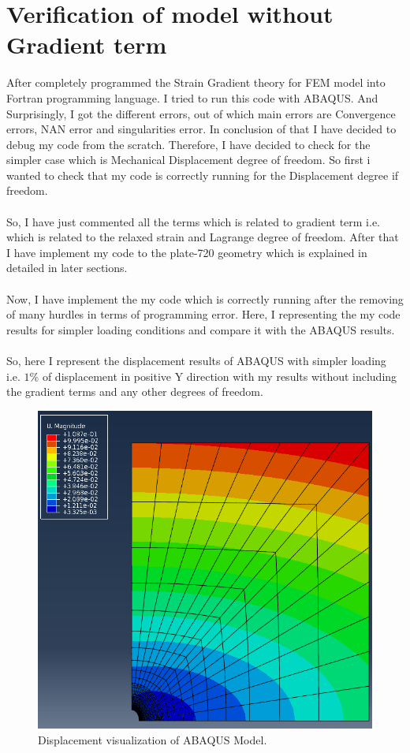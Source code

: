 \documentclass[12pt]{article}
\begin{document}
\section{Verification of model without Gradient term}
After completely programmed the Strain Gradient theory for FEM model into Fortran programming language. I tried to run this code with ABAQUS. And Surprisingly, I got the different errors, out of which main errors are Convergence errors, NAN error and singularities error. In conclusion of that I have decided to debug my code from the scratch. Therefore, I have decided to check for the simpler case which is Mechanical Displacement degree of freedom. So first i wanted to check that my code is correctly running for the Displacement degree if freedom.
\\
\\
So, I have just commented all the terms which is related to gradient term i.e. which is related to the relaxed strain and Lagrange degree of freedom. After that I have implement my code to the plate-720 geometry which is explained in detailed in later sections.
\\
\\ 
Now, I have implement the my code which is correctly running after the removing of many hurdles in terms of programming error. Here, I representing the my code results for simpler loading conditions and compare it with the ABAQUS results.  
\\
\\
So, here I represent the displacement results of ABAQUS with simpler loading i.e. $ 1 \% $ of displacement in positive Y direction with my results without including the gradient terms and any other degrees of freedom.
\begin{figure}[H]
	\begin{center}
		\includegraphics[scale=0.4]{ABAQUS_result.png}  
	\end{center}  
    \caption{Displacement visualization of ABAQUS Model.}
\end{figure}
\end{document}
